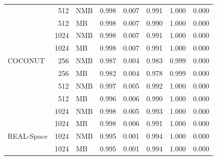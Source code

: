 \begin{table}[htbp]
\begin{tabular}{@{}l r l r r r r r@{}}
     & 512 & NMB & 0.998 & 0.007 & 0.991 & 1.000 & 0.000 \\
     & 512 & MB & 0.998 & 0.007 & 0.990 & 1.000 & 0.000 \\
     & 1024 & NMB & 0.998 & 0.007 & 0.991 & 1.000 & 0.000 \\
     & 1024 & MB & 0.998 & 0.007 & 0.991 & 1.000 & 0.000 \\
    \addlinespace
    COCONUT & 256 & NMB & 0.987 & 0.004 & 0.983 & 0.999 & 0.000 \\
     & 256 & MB & 0.982 & 0.004 & 0.978 & 0.999 & 0.000 \\
     & 512 & NMB & 0.997 & 0.005 & 0.992 & 1.000 & 0.000 \\
     & 512 & MB & 0.996 & 0.006 & 0.990 & 1.000 & 0.000 \\
     & 1024 & NMB & 0.998 & 0.005 & 0.993 & 1.000 & 0.000 \\
     & 1024 & MB & 0.998 & 0.006 & 0.991 & 1.000 & 0.000 \\
    \addlinespace
    REAL-Space & 1024 & NMB & 0.995 & 0.001 & 0.994 & 1.000 & 0.000 \\
     & 1024 & MB & 0.995 & 0.001 & 0.994 & 1.000 & 0.000 \\
    \bottomrule
  \end{tabular}
\end{table}
